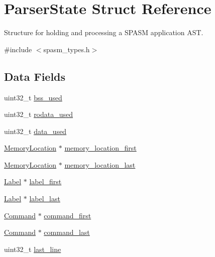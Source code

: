 \hypertarget{struct_parser_state}{
\section{\-Parser\-State \-Struct \-Reference}
\label{struct_parser_state}
}


\-Structure for holding and processing a \-S\-P\-A\-S\-M application \-A\-S\-T.  




{\ttfamily \#include $<$spasm\-\_\-types.\-h$>$}

\subsection*{\-Data \-Fields}
\begin{DoxyCompactItemize}
\item 
uint32\-\_\-t \hyperlink{struct_parser_state_ac10c4556abd95773deb418ef3b26fab8}{bss\-\_\-used}
\item 
uint32\-\_\-t \hyperlink{struct_parser_state_a610de7682a50d494f840c335b66b88b7}{rodata\-\_\-used}
\item 
uint32\-\_\-t \hyperlink{struct_parser_state_a228f3fe68f7d2f6b722f8ab6d2d6546a}{data\-\_\-used}
\item 
\hyperlink{struct_memory_location}{\-Memory\-Location} $\ast$ \hyperlink{struct_parser_state_a93f0b2009fa812b3852584e3acf7e3e0}{memory\-\_\-location\-\_\-first}
\item 
\hyperlink{struct_memory_location}{\-Memory\-Location} $\ast$ \hyperlink{struct_parser_state_a5b8f112e7b118b93287c935dbe541224}{memory\-\_\-location\-\_\-last}
\item 
\hyperlink{struct_label}{\-Label} $\ast$ \hyperlink{struct_parser_state_a98486e4d2dad370428a3b93c9d7bd3ae}{label\-\_\-first}
\item 
\hyperlink{struct_label}{\-Label} $\ast$ \hyperlink{struct_parser_state_a6d2388b717a802c8695be589f79db346}{label\-\_\-last}
\item 
\hyperlink{struct_command}{\-Command} $\ast$ \hyperlink{struct_parser_state_a23889d26f95df19cf4fad8ca001a343f}{command\-\_\-first}
\item 
\hyperlink{struct_command}{\-Command} $\ast$ \hyperlink{struct_parser_state_abdb676c62455b934215960211eedc209}{command\-\_\-last}
\item 
uint32\-\_\-t \hyperlink{struct_parser_state_a7cd348383137d4da985c1d17a64ba93c}{last\-\_\-line}
\end{DoxyCompactItemize}


